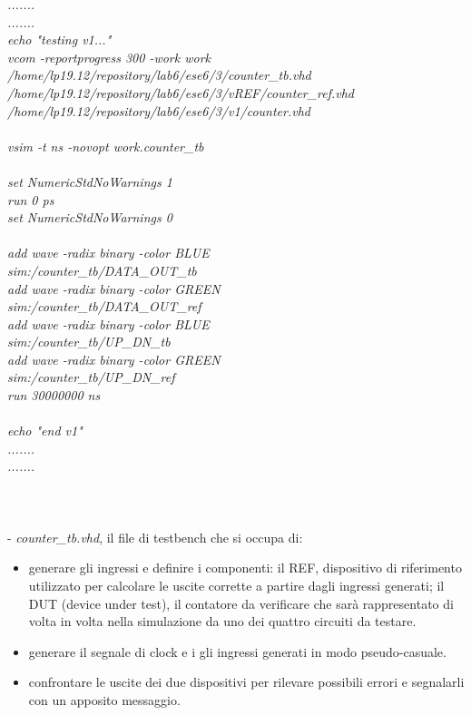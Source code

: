 \textit{.......\\
.......\\
echo "testing v1..."\\
vcom -reportprogress 300 -work work\\ /home/lp19.12/repository/lab6/ese6/3/counter\_tb.vhd\\ /home/lp19.12/repository/lab6/ese6/3/vREF/counter\_ref.vhd\\ /home/lp19.12/repository/lab6/ese6/3/v1/counter.vhd\\
\\
vsim -t ns -novopt work.counter\_tb\\
\\
set NumericStdNoWarnings 1\\
run 0 ps\\
set NumericStdNoWarnings 0\\
\\
add wave -radix binary   -color BLUE\\      sim:/counter\_tb/DATA\_OUT\_tb\\
add wave -radix binary   -color GREEN\\    sim:/counter\_tb/DATA\_OUT\_ref\\
add wave -radix binary   -color BLUE\\     sim:/counter\_tb/UP\_DN\_tb\\
add wave -radix binary   -color GREEN \\   sim:/counter\_tb/UP\_DN\_ref\\
run 30000000 ns\\
\\
echo "end v1"\\
.......\\
.......}\\
\\
\\
\\
- \textit{counter\_tb.vhd}, il file di testbench che si occupa di:
\begin{itemize}
	\item {generare gli ingressi e definire i componenti: il REF, dispositivo di riferimento utilizzato per calcolare le uscite corrette a partire dagli ingressi generati; il DUT (device under test), il contatore da verificare che sarà rappresentato di volta in volta nella simulazione da uno dei quattro circuiti da testare.}
	\item {generare il segnale di clock e i gli ingressi generati in modo pseudo-casuale.}
	\item {confrontare le uscite dei due dispositivi per rilevare possibili errori e segnalarli con un apposito messaggio.}
\end{itemize}
